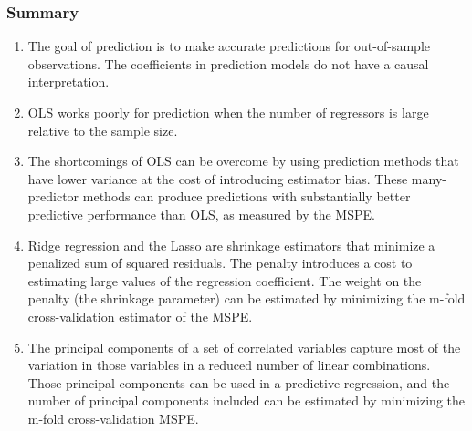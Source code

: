 

\begin{frame}
\frametitle{Summary}
\begin{enumerate}
\item The goal of prediction is to make accurate predictions for out-of-sample observations. The coefficients in prediction models do not have a causal interpretation.
\item OLS works poorly for prediction when the number of regressors is large relative to the sample size.
\item The shortcomings of OLS can be overcome by using prediction methods that have lower variance at the cost of introducing estimator bias. These many-predictor methods can produce predictions with substantially better predictive performance than OLS, as measured by the MSPE.
\item Ridge regression and the Lasso are shrinkage estimators that minimize a penalized sum of squared residuals. The penalty introduces a cost to estimating large values of the regression coefficient. The weight on the penalty (the shrinkage parameter) can be estimated by minimizing the m-fold cross-validation estimator of the MSPE.
\item The principal components of a set of correlated variables capture most of the variation in those variables in a reduced number of linear combinations. Those principal components can be used in a predictive regression, and the number of principal components included can be estimated by minimizing the m-fold cross-validation MSPE.
\end{enumerate}
\end{frame}


